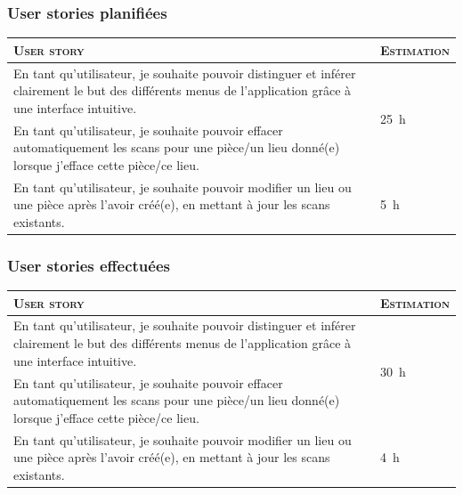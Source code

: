 \documentclass{elsarticle}
\newcommand{\est}[1]{\multirow{2}{*}{\SI{#1}{\hour}}}
\begin{document}
\subsubsection{User stories planifiées}
\begin{table}[H]
	\centering
	\begin{tabular}{p{14cm}m{2cm}}
		\toprule
		\textsc{User story} & \textsc{Estimation}\\
		\midrule
		En tant qu'utilisateur, je souhaite pouvoir distinguer et inférer clairement le but des différents menus de l'application grâce à une interface intuitive. & \est{25}\\
		\midrule
		En tant qu'utilisateur, je souhaite pouvoir effacer automatiquement les scans pour une pièce/un lieu donné(e) lorsque j'efface cette pièce/ce lieu. & \est{2}\\
		\midrule
		En tant qu'utilisateur, je souhaite pouvoir modifier un lieu ou une pièce après l'avoir créé(e), en mettant à jour les scans existants. & \est{5}\\
		\bottomrule
	\end{tabular}
\end{table}

\subsubsection{User stories effectuées}
\begin{table}[H]
	\centering
	\begin{tabular}{p{14cm}m{2cm}}
		\toprule
		\textsc{User story} & \textsc{Estimation}\\
		\midrule
		En tant qu'utilisateur, je souhaite pouvoir distinguer et inférer clairement le but des différents menus de l'application grâce à une interface intuitive. & \est{30}\\
		\midrule
		En tant qu'utilisateur, je souhaite pouvoir effacer automatiquement les scans pour une pièce/un lieu donné(e) lorsque j'efface cette pièce/ce lieu. & \est{5}\\
		\midrule
		En tant qu'utilisateur, je souhaite pouvoir modifier un lieu ou une pièce après l'avoir créé(e), en mettant à jour les scans existants. & \est{4}\\
		\bottomrule
	\end{tabular}
\end{table}
\end{document}
